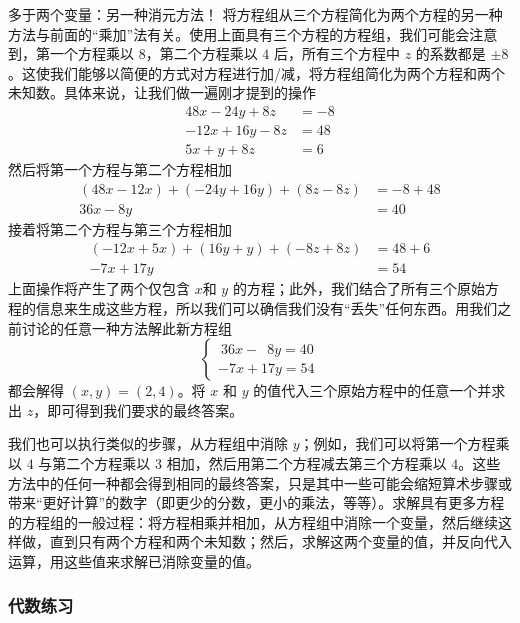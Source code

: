 \begin{method}{多于两个变量：另一种消元方法！}
    将方程组从三个方程简化为两个方程的另一种方法与前面的``乘加''法有关。使用上面具有三个方程的方程组，我们可能会注意到，第一个方程乘以 $8$，第二个方程乘以 $4$ 后，所有三个方程中 $z$ 的系数都是 $\pm 8$。这使我们能够以简便的方式对方程进行加/减，将方程组简化为两个方程和两个未知数。具体来说，让我们做一遍刚才提到的操作
    \begin{align*}
        48x - 24y + 8z &= -8 \\
        -12x + 16y - 8z &= 48 \\
        5x + y + 8z &= 6
    \end{align*}
    然后将第一个方程与第二个方程相加
    \begin{align*}
        (48x - 12x) + (-24y + 16y) + (8z - 8z) &= -8 + 48 \\
        36x - 8y &= 40
    \end{align*}
    接着将第二个方程与第三个方程相加
    \begin{align*}
        (-12x + 5x) + (16y + y) + (-8z + 8z) &= 48 + 6 \\
        -7x + 17y &= 54
    \end{align*}
    上面操作将产生了两个仅包含 $x$和 $y$ 的方程；此外，我们结合了所有三个原始方程的信息来生成这些方程，所以我们可以确信我们没有``丢失''任何东西。用我们之前讨论的任意一种方法解此新方程组
    $$
    \begin{cases}
        \: 36x - \enspace 8y = 40 \\
        -7x + 17y = 54  
    \end{cases}
    $$
    都会解得 $(x, y) = (2, 4)$。将 $x$ 和 $y$ 的值代入三个原始方程中的任意一个并求出 $z$，即可得到我们要求的最终答案。

    我们也可以执行类似的步骤，从方程组中消除 $y$；例如，我们可以将第一个方程乘以 $4$ 与第二个方程乘以 $3$ 相加，然后用第二个方程减去第三个方程乘以 $4$。这些方法中的任何一种都会得到相同的最终答案，只是其中一些可能会缩短算术步骤或带来``更好计算''的数字（即更少的分数，更小的乘法，等等）。求解具有更多方程的方程组的一般过程：将方程相乘并相加，从方程组中消除一个变量，然后继续这样做，直到只有两个方程和两个未知数；然后，求解这两个变量的值，并反向代入运算，用这些值来求解已消除变量的值。
\end{method}

\subsubsection*{代数练习}

